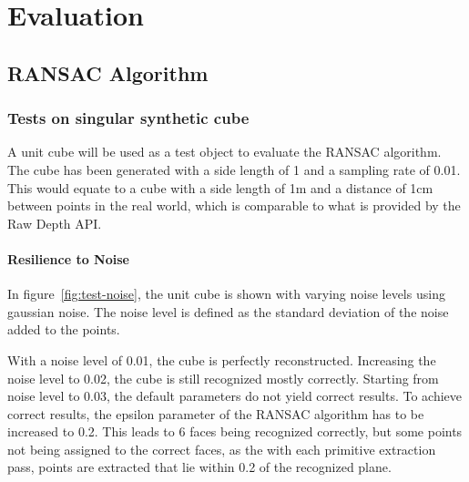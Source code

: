 \chapter{Evaluation}\label{ch:evaluation}


\section{RANSAC Algorithm}

\subsection{Tests on singular synthetic cube}

A unit cube will be used as a test object to evaluate the RANSAC algorithm.
The cube has been generated with a side length of 1 and a sampling rate of 0.01.
This would equate to a cube with a side length of 1m and a distance of 1cm between points in the real world,
which is comparable to what is provided by the Raw Depth API\@.

\subsubsection{Resilience to Noise}
In figure~\ref{fig:test-noise}, the unit cube is shown with varying noise levels using gaussian noise.
The noise level is defined as the standard deviation of the noise added to the points.

With a noise level of 0.01, the cube is perfectly reconstructed.
Increasing the noise level to 0.02, the cube is still recognized mostly correctly.
Starting from noise level to 0.03, the default parameters do not yield correct results.
To achieve correct results, the epsilon parameter of the RANSAC algorithm has to be increased to 0.2.
This leads to 6 faces being recognized correctly, but some points not being assigned to the correct faces,
as the with each primitive extraction pass, points are extracted that lie within 0.2 of the recognized plane.


